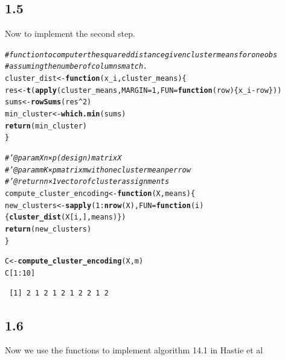\documentclass[10pt, a4paper, english]{article}\usepackage[]{graphicx}\usepackage[dvipsnames]{xcolor}
\makeatletter
\newcommand{\hlnum}[1]{\textcolor[rgb]{0.686,0.059,0.569}{#1}}%
\newcommand{\hlcom}[1]{\textcolor[rgb]{0.678,0.584,0.686}{\textit{#1}}}%
\newcommand{\hlopt}[1]{\textcolor[rgb]{0,0,0}{#1}}%
\newcommand{\hlstd}[1]{\textcolor[rgb]{0.345,0.345,0.345}{#1}}%
\newcommand{\hlkwa}[1]{\textcolor[rgb]{0.161,0.373,0.58}{\textbf{#1}}}%
\newcommand{\hlkwb}[1]{\textcolor[rgb]{0.69,0.353,0.396}{#1}}%
\newcommand{\hlkwc}[1]{\textcolor[rgb]{0.333,0.667,0.333}{#1}}%
\newcommand{\hlkwd}[1]{\textcolor[rgb]{0.737,0.353,0.396}{\textbf{#1}}}%
\newenvironment{kframe}{%
 \def\at@end@of@kframe{}%
 \ifinner\ifhmode%
  \def\at@end@of@kframe{\end{minipage}}%
  \begin{minipage}{\columnwidth}%
 \fi\fi%
 \def\FrameCommand##1{\hskip\@totalleftmargin \hskip-\fboxsep
 \colorbox{shadecolor}{##1}\hskip-\fboxsep
     \hskip-\linewidth \hskip-\@totalleftmargin \hskip\columnwidth}%
 \MakeFramed {\advance\hsize-\width
   \@totalleftmargin\z@ \linewidth\hsize
   \@setminipage}}%
 {\par\unskip\endMakeFramed%
 \at@end@of@kframe}
\newenvironment{knitrout}{}{} %
\makeatother
\begin{document}
\subsection{1.5}
Now to implement the second step.
\begin{knitrout}
\color{fgcolor}\begin{kframe}
\begin{alltt}
\hlcom{#function to computer the squared distance given cluster means for one obs}
\hlcom{#assuming the number of columns match .}
\hlstd{cluster_dist} \hlkwb{<-} \hlkwa{function}\hlstd{(}\hlkwc{x_i}\hlstd{,} \hlkwc{cluster_means}\hlstd{)\{}
  \hlstd{res} \hlkwb{<-} \hlkwd{t}\hlstd{(}\hlkwd{apply}\hlstd{(cluster_means,} \hlkwc{MARGIN}\hlstd{=}\hlnum{1}\hlstd{,} \hlkwc{FUN}\hlstd{=} \hlkwa{function}\hlstd{(}\hlkwc{row}\hlstd{)\{x_i} \hlopt{-} \hlstd{row\}))}
  \hlstd{sums} \hlkwb{<-} \hlkwd{rowSums}\hlstd{(res}\hlopt{^}\hlnum{2}\hlstd{)}
  \hlstd{min_cluster} \hlkwb{<-} \hlkwd{which.min}\hlstd{(sums)}
  \hlkwd{return}\hlstd{(min_cluster)}
\hlstd{\}}

\hlcom{#' @param X n×p (design) matrix X }
\hlcom{#' @param m  K×p matrix m with one cluster mean per row}
\hlcom{#' @return  n × 1 vector of cluster assignments}
\hlstd{compute_cluster_encoding} \hlkwb{<-} \hlkwa{function}\hlstd{(}\hlkwc{X}\hlstd{,} \hlkwc{means}\hlstd{) \{}
\hlstd{new_clusters} \hlkwb{<-} \hlkwd{sapply}\hlstd{(}\hlnum{1}\hlopt{:}\hlkwd{nrow}\hlstd{(X),} \hlkwc{FUN} \hlstd{=} \hlkwa{function}\hlstd{(}\hlkwc{i}\hlstd{)\{} \hlkwd{cluster_dist}\hlstd{(X[i,], means)\})}
\hlkwd{return}\hlstd{(new_clusters)}
\hlstd{\}}

\hlstd{C} \hlkwb{<-} \hlkwd{compute_cluster_encoding}\hlstd{(X, m)}
\hlstd{C[}\hlnum{1}\hlopt{:} \hlnum{10}\hlstd{]}
\end{alltt}
\begin{verbatim}
 [1] 2 1 2 1 2 1 2 2 1 2
\end{verbatim}
\end{kframe}
\end{knitrout}

\subsection{1.6}
Now we use the functions to implement algorithm 14.1 in Hastie et al
\end{document}
